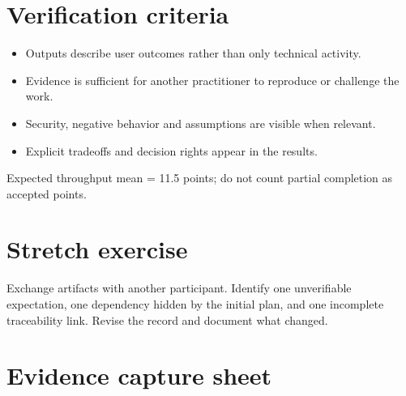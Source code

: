 \documentclass[11pt,letterpaper]{article}
\begin{document}
\section{Verification criteria}
\begin{itemize}[leftmargin=*,itemsep=2pt]
\item Outputs describe user outcomes rather than only technical activity.
\item Evidence is sufficient for another practitioner to reproduce or challenge the work.
\item Security, negative behavior and assumptions are visible when relevant.
\item Explicit tradeoffs and decision rights appear in the results.
\end{itemize}
\begin{tcolorbox}[colback=amberback,colframe=navy,title={Instructor note / expected reasoning},breakable]
Expected throughput mean = 11.5 points; do not count partial completion as accepted points.

\end{tcolorbox}
\section{Stretch exercise}
Exchange artifacts with another participant. Identify one unverifiable expectation, one dependency hidden by the initial plan, and one incomplete traceability link. Revise the record and document what changed.

\section{Evidence capture sheet}
\end{document}

